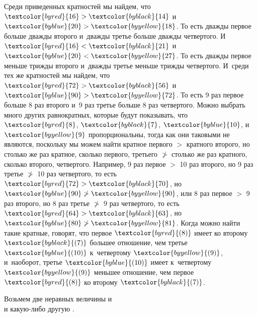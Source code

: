 \documentclass[letters,booklanguage=russian]{byrnebook}
\begin{document}
Среди приведенных кратностей мы найдем, что $\textcolor{byred}{16} > \textcolor{byblack}{14}$ и~$\textcolor{byblue}{20} > \textcolor{byyellow}{18}$. То есть дважды первое больше дважды второго и~дважды третье больше дважды четвертого. И~$\textcolor{byred}{16} < \textcolor{byblack}{21}$ и~$\textcolor{byblue}{20} < \textcolor{byyellow}{27}$. То есть дважды первое меньше трижды второго и~дважды третье меньше трижды четвертого. И~среди тех же кратностей мы найдем, что $\textcolor{byred}{72} > \textcolor{byblack}{56}$ и~$\textcolor{byblue}{90} > \textcolor{byyellow}{72}$. То есть 9 раз первое больше 8 раз второго и~9 раз третье больше 8 раз четвертого. Можно выбрать много других равнократных, которые будут показывать, что $\textcolor{byred}{8}$, $\textcolor{byblack}{7}$, $\textcolor{byblue}{10}$, и~$\textcolor{byyellow}{9}$ пропорциональны, тогда как они таковыми не являются, поскольку мы можем найти кратное первого $>$ кратного второго, но столько же раз кратное, сколько первого, третьего $\ngtr$ столько же раз кратного, сколько второго, четвертого. Например, 9 раз первое $>$ 10 раз второго, но 9 раз третье $\ngtr$ 10 раз четвертого, то есть $\textcolor{byred}{72} > \textcolor{byblack}{70}$, но $\textcolor{byblue}{90} \ngtr \textcolor{byyellow}{90}$, или 8 раз первое $>$ 9 раз второго, но 8 раз третье $\ngtr$ 9 раз четвертого, то есть $\textcolor{byred}{64} > \textcolor{byblack}{63}$, но $\textcolor{byblue}{80} \ngtr \textcolor{byyellow}{81}$. Когда можно найти такие кратные, говорят, что первое $\textcolor{byred}{(8)}$ имеет ко второму $\textcolor{byblack}{(7)}$ большее отношение, чем третье $\textcolor{byblue}{(10)}$ к~четвертому $\textcolor{byyellow}{(9)}$, и~наоборот, третье $\textcolor{byblue}{(10)}$ имеет к~четвертому $\textcolor{byyellow}{(9)}$ меньшее отношение, чем первое $\textcolor{byred}{(8)}$ ко второму $\textcolor{byblack}{(7)}$.

\vfill\pagebreak


\begin{center}
Возьмем две неравных величины  и~\\
и какую-либо другую .
\end{center}
\end{document}
